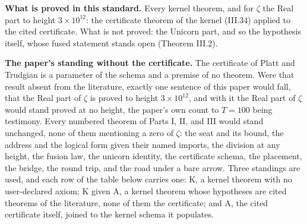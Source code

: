 \documentclass[10pt]{article}
\begin{document}
\textbf{What is proved in this standard.} Every kernel theorem, and for
\(\zeta\) the Real part to height \(3 \times 10^{12}\): the certificate
theorem of the kernel (III.34) applied to the cited certificate. What is
not proved: the Unicorn part, and so the hypothesis itself, whose fused
statement stands open (Theorem III.2).

\textbf{The paper's standing without the certificate.} The certificate
of Platt and Trudgian is a parameter of the schema and a premise of no
theorem. Were that result absent from the literature, exactly one
sentence of this paper would fall, that the Real part of \(\zeta\) is
proved to height \(3 \times 10^{12}\), and with it the Real part of
\(\zeta\) would stand proved at no height, the paper's own count to
\(T = 100\) being testimony. Every numbered theorem of Parts I, II, and
III would stand unchanged, none of them mentioning a zero of \(\zeta\):
the seat and its bound, the address and the logical form given their
named imports, the division at any height, the fusion law, the unicorn
identity, the certificate schema, the placement, the bridge, the round
trip, and the road under a bare arrow. Three standings are used, and
each row of the table below carries one: K, a kernel theorem with no
user-declared axiom; K given A, a kernel theorem whose hypotheses are
cited theorems of the literature, none of them the certificate; and A,
the cited certificate itself, joined to the kernel schema it populates.
\end{document}
